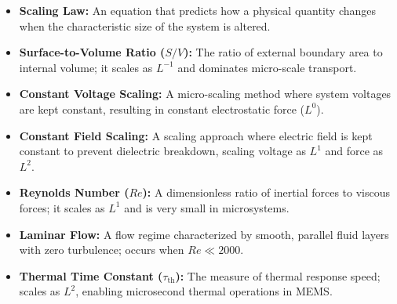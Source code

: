 \documentclass[12pt,a4paper]{article}
\begin{document}
\begin{tcolorbox}[defbox, title={\textbf{One-Line Definitions}}]
\begin{itemize}[leftmargin=*, itemsep=2.5pt, topsep=0pt]
  \item \textbf{Scaling Law:} An equation that predicts how a physical quantity changes when the characteristic size of the system is altered.
  \item \textbf{Surface-to-Volume Ratio ($S/V$):} The ratio of external boundary area to internal volume; it scales as $L^{-1}$ and dominates micro-scale transport.
  \item \textbf{Constant Voltage Scaling:} A micro-scaling method where system voltages are kept constant, resulting in constant electrostatic force ($L^0$).
  \item \textbf{Constant Field Scaling:} A scaling approach where electric field is kept constant to prevent dielectric breakdown, scaling voltage as $L^1$ and force as $L^2$.
  \item \textbf{Reynolds Number ($Re$):} A dimensionless ratio of inertial forces to viscous forces; it scales as $L^1$ and is very small in microsystems.
  \item \textbf{Laminar Flow:} A flow regime characterized by smooth, parallel fluid layers with zero turbulence; occurs when $Re \ll 2000$.
  \item \textbf{Thermal Time Constant ($\tau_{\text{th}}$):} The measure of thermal response speed; scales as $L^2$, enabling microsecond thermal operations in MEMS.
\end{itemize}
\end{tcolorbox}
\end{document}
